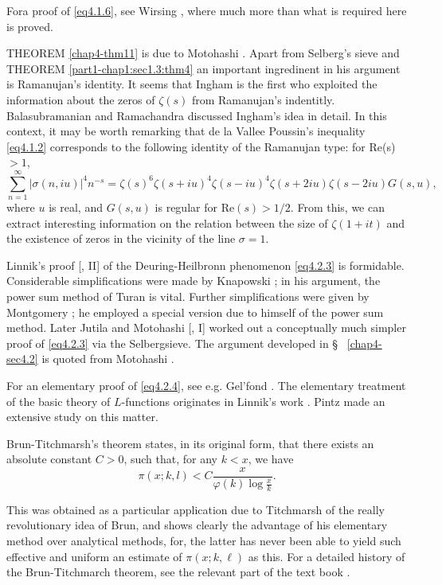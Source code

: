 For\pageoriginale a proof of \eqref{eq4.1.6}, see Wirsing
\cite{key82}, where much more than what is required here is proved. 

THEOREM \ref{chap4-thm11} is due to Motohashi \cite{key61}. Apart from
Selberg's sieve and 
THEOREM \ref{part1-chap1:sec1.3:thm4} an important ingredinent in his
argument is Ramanujan's 
identity. It seems that Ingham \cite{key27} is the first who exploited the
information about the zeros of $\zeta(s)$ from Ramanujan's
indentitly. Balasubramanian and Ramachandra \cite{key1} discussed Ingham's
idea in detail. In this context, it may be worth remarking that de la
Vallee Poussin's inequality \eqref{eq4.1.2} corresponds to the following
identity of the Ramanujan type: for Re(s)$>1$, 
$$
  \sum^{\infty}_{n=1}| \sigma(n,iu)|^4 n^{-s} = \zeta(s)^6 \zeta(s +
  iu)^4 \zeta(s - iu)^4 \zeta(s + 2iu) \zeta(s - 2iu) G(s, u), 
$$
where $u$ is real, and $G(s, u)$ is regular for Re$(s) > 1/2$. From
this, we can extract interesting information on the relation between
the size of $\zeta(1+ it)$ and the existence of zeros in the vicinity
of the line $\sigma =1$. 

Linnik's proof [\cite{key47}, II] of the Deuring-Heilbronn phenomenon\break
\eqref{eq4.2.3} 
is formidable. Considerable simplifications were made by Kna\-powski
\cite{key43}; in his argument, the power sum method of Turan is
vital. Further simplifications were given by Montgomery \cite{key50}; he
employed a special version due to himself of the power sum
method. Later Jutila \cite{key40} and Motohashi [\cite{key55}, I]
worked out a conceptually much simpler proof of \eqref{eq4.2.3} via the
Selberg\pageoriginale sieve. The 
argument developed in \S~ \ref{chap4-sec4.2} is quoted from Motohashi
\cite{key57}.  

For an elementary proof of \eqref{eq4.2.4}, see e.g. Gel'fond
\cite{key18}. The 
elementary treatment of the basic theory of $L$-functions originates in
Linnik's work \cite{key46}. Pintz made an extensive study on this matter. 

Brun-Titchmarsh's theorem states, in its original form, that there
exists an absolute constant $C > 0$, such that, for any $k < x$, we
have 
$$
\pi (x; k, l) < C \frac{x}{\varphi (k) \log \frac{x}{k}}.
$$

This was obtained as a particular application due to Titchmarsh of the
really revolutionary idea of Brun, and shows clearly the advantage of
his elementary method over analytical methods, for, the latter has
never been able to yield such effective and uniform an estimate of
$\pi (x; k, \ell)$ as this. For a detailed history of the
Brun-Titchmarch theorem, see the relevant part of the text book
\cite{key21}. 

